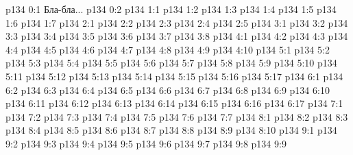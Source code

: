 \author{Промежуточные создания}
\vs p134 0:1  Бла-бла...
\vs p134 0:2 
\vs p134 1:1 
\vs p134 1:2 
\vs p134 1:3 
\vs p134 1:4 
\vs p134 1:5 
\vs p134 1:6 
\vs p134 1:7 
\vs p134 2:1 
\vs p134 2:2 
\vs p134 2:3 
\vs p134 2:4 \pc 
\vs p134 2:5 
\vs p134 3:1 
\vs p134 3:2 
\vs p134 3:3 
\vs p134 3:4 
\vs p134 3:5 
\vs p134 3:6 
\vs p134 3:7 
\vs p134 3:8 \pc 
{}
\vs p134 4:1 
\vs p134 4:2 
\vs p134 4:3 
\vs p134 4:4 
\vs p134 4:5 
\vs p134 4:6 
\vs p134 4:7 
\vs p134 4:8 
\vs p134 4:9 
\vs p134 4:10 
\vs p134 5:1 
\vs p134 5:2 \pc 
\vs p134 5:3 
\vs p134 5:4 
\vs p134 5:5 
\vs p134 5:6 
\vs p134 5:7 
\vs p134 5:8 
\vs p134 5:9 
\vs p134 5:10 
\vs p134 5:11 
\vs p134 5:12 \pc 
\vs p134 5:13 
\vs p134 5:14 \pc 
\vs p134 5:15 
\vs p134 5:16 
\vs p134 5:17 
\vs p134 6:1 
\vs p134 6:2 
\vs p134 6:3 
\vs p134 6:4 
\vs p134 6:5 
\vs p134 6:6 
\vs p134 6:7 
\vs p134 6:8 
\vs p134 6:9 
\vs p134 6:10 
\vs p134 6:11 
\vs p134 6:12 
\vs p134 6:13 
\vs p134 6:14 
\vs p134 6:15 
\vs p134 6:16 
\vs p134 6:17 
\vs p134 7:1 
\vs p134 7:2 
\vs p134 7:3 
\vs p134 7:4 
\vs p134 7:5 
\vs p134 7:6 
\vs p134 7:7 
\vs p134 8:1 
\vs p134 8:2 
\vs p134 8:3 \pc 
\vs p134 8:4 
\vs p134 8:5 
\vs p134 8:6 \pc 
\vs p134 8:7 
\vs p134 8:8 
\vs p134 8:9 \pc 
\vs p134 8:10 
\vs p134 9:1 
\vs p134 9:2 
\vs p134 9:3 
\vs p134 9:4 
\vs p134 9:5 
\vs p134 9:6 
\vs p134 9:7 
\vs p134 9:8 \pc 
\vs p134 9:9 
\quizlink
